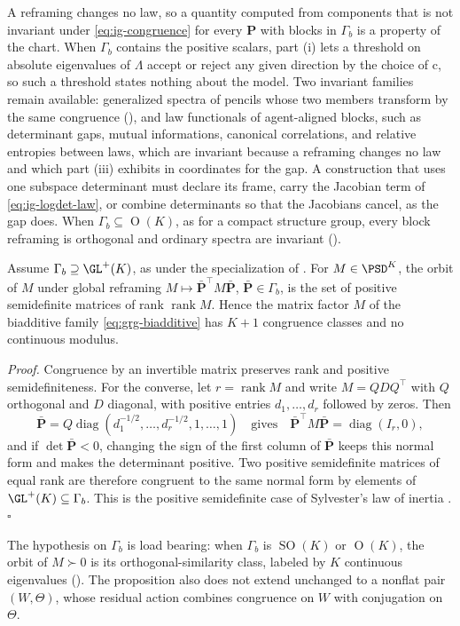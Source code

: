 \medskip
A reframing changes no law, so a quantity computed from components that is not
invariant under \eqref{eq:ig-congruence} for every \(\mathbf P\) with blocks in \(\Gamma_b\) is
a property of the chart. When \(\Gamma_b\) contains the positive scalars, part (i)
lets a threshold on absolute eigenvalues of \(\Lambda\) accept or reject any given
direction by the choice of \(\mathrm c\), so such a threshold states nothing about the model.
Two invariant families remain available: generalized spectra of pencils whose two
members transform by the same congruence (), and law
functionals of agent-aligned blocks, such as determinant gaps, mutual informations,
canonical correlations, and relative entropies between laws, which are invariant
because a reframing changes no law and which part (iii) exhibits in coordinates for
the gap. A construction that uses one subspace determinant must declare its frame,
carry the Jacobian term of \eqref{eq:ig-logdet-law}, or combine determinants so that
the Jacobians cancel, as the gap does. When \(\Gamma_b\subseteq\operatorname{O}(K)\), as
for a compact structure group, every block reframing is orthogonal and ordinary
spectra are invariant ().

Assume \(\Gamma_b\supseteq\GL^+(K)\), as under the specialization of
. For \(M\in\PSD^K\), the orbit of \(M\) under global
reframing \(M\mapsto\bar{\mathbf P}^\top M\bar{\mathbf P}\), \(\bar{\mathbf P}\in\Gamma_b\), is the set of positive
semidefinite matrices of rank \(\operatorname{rank}M\). Hence the matrix factor \(M\)
of the biadditive family \eqref{eq:grg-biadditive} has \(K+1\) congruence classes and
no continuous modulus. 

\noindent\emph{Proof.}
Congruence by an invertible matrix preserves rank and positive semidefiniteness. For
the converse, let \(r=\operatorname{rank}M\) and write \(M=QDQ^\top\) with \(Q\)
orthogonal and \(D\) diagonal, with positive entries \(d_1,\dots,d_r\) followed by
zeros. Then
\[
\bar{\mathbf P}=Q\operatorname{diag}\left(d_1^{-1/2},\dots,d_r^{-1/2},1,\dots,1\right)
\quad\text{gives}\quad
\bar{\mathbf P}^\top M\bar{\mathbf P}=\operatorname{diag}(I_r,0),
\]
and if \(\det\bar{\mathbf P}<0\), changing the
sign of the first column of \(\bar{\mathbf P}\) keeps this normal form and makes the
determinant positive. Two positive semidefinite matrices of equal rank are therefore
congruent to the same normal form by elements of \(\GL^+(K)\subseteq\Gamma_b\). This is
the positive semidefinite case of Sylvester's law of inertia
\citep[\S4.5]{HornJohnson2013}. \hfill$\square$

\medskip
The hypothesis on \(\Gamma_b\) is load bearing: when \(\Gamma_b\) is
\(\operatorname{SO}(K)\) or \(\operatorname{O}(K)\), the orbit of \(M\succ0\) is its
orthogonal-similarity class, labeled by \(K\) continuous eigenvalues
(). The proposition also does not extend unchanged to a
nonflat pair \((W,\Theta)\), whose residual action combines congruence on \(W\) with
conjugation on \(\Theta\).

